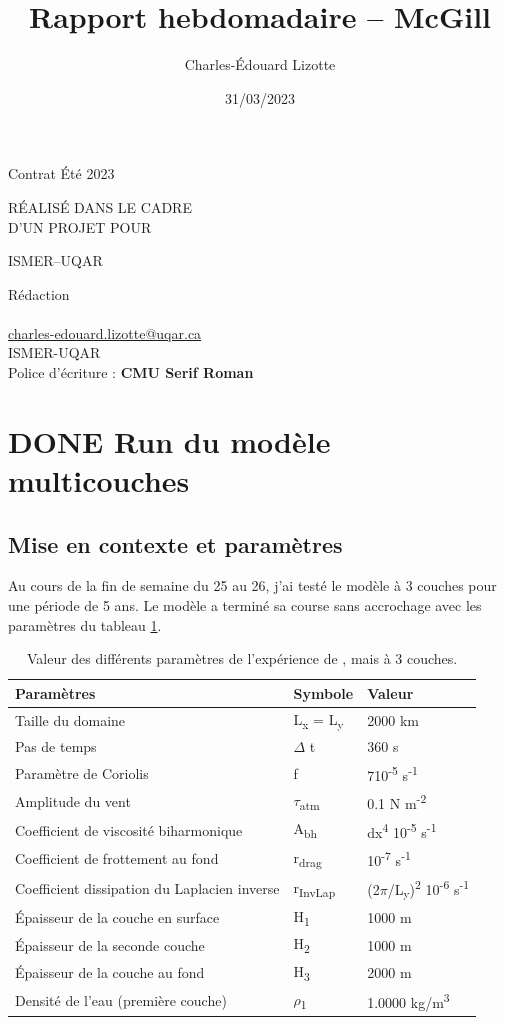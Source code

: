 \documentclass[10pt]{report}
\author{Charles-Édouard Lizotte}
\date{31/03/2023}
\title{Rapport hebdomadaire -- McGill}
\makeatletter
\numberwithin{equation}{section}
\newcommand{\mytitlepage}{
\begin{titlepage}
\begin{center}
{\Huge Contrat Été 2023 \par}
\vspace{2cm}
{\Huge \MakeUppercase{\thetitle} \par}
\vspace{2cm}
RÉALISÉ DANS LE CADRE\\ D'UN PROJET POUR \par
\vspace{2cm}
{\Huge ISMER--UQAR \par}
\vspace{2cm}
{\thedate}
\end{center}
\vfill
Rédaction \\
{\theauthor}\\
\url{charles-edouard.lizotte@uqar.ca}\\
ISMER-UQAR\\
Police d'écriture : \textbf{CMU Serif Roman}
\end{titlepage}
}
\makeatother
\begin{document}
\mytitlepage
\tableofcontents\newpage

\section{{\bfseries\sffamily DONE} Run du modèle multicouches}
\label{sec:orge168c7f}
\subsection{Mise en contexte et paramètres}
\label{sec:org00db628}
Au cours de la fin de semaine du 25 au 26, j'ai testé le modèle à 3 couches pour une période de 5 ans.
Le modèle a terminé sa course sans accrochage avec les paramètres du tableau \ref{tab:orgc535067}.

\begin{table}[htbp]
\caption{\label{tab:orgc535067}Valeur des différents paramètres de l'expérience de , mais à 3 couches.}
\centering
\begin{tabular}{lll}
\hline
\hline
Paramètres & Symbole & Valeur\\[0pt]
\hline
Taille du domaine & L\textsubscript{x} = L\textsubscript{y} & 2000 km\\[0pt]
Pas de temps & \(\Delta\) t & 360 s\\[0pt]
Paramètre de Coriolis & f & 7\texttimes{}10\textsuperscript{-5} s\textsuperscript{-1}\\[0pt]
Amplitude du vent & \(\tau\)\textsubscript{atm} & 0.1 N m\textsuperscript{-2}\\[0pt]
Coefficient de viscosité biharmonique & A\textsubscript{bh} & dx\textsuperscript{4} \texttimes{}10\textsuperscript{-5} s\textsuperscript{-1}\\[0pt]
Coefficient de frottement au fond & r\textsubscript{drag} & 10\textsuperscript{-7} s\textsuperscript{-1}\\[0pt]
Coefficient dissipation du Laplacien inverse & r\textsubscript{InvLap} & (2\(\pi\)/L\textsubscript{y})\textsuperscript{2} \texttimes{} 10\textsuperscript{-6} s\textsuperscript{-1}\\[0pt]
Épaisseur de la couche en surface & H\textsubscript{1} & 1000 m\\[0pt]
Épaisseur de la seconde couche & H\textsubscript{2} & 1000 m\\[0pt]
Épaisseur de la couche au fond & H\textsubscript{3} & 2000 m\\[0pt]
Densité de l'eau (première couche) & \(\rho\)\textsubscript{1} & 1.0000 kg/m\textsuperscript{3}\\[0pt]

\end{tabular}
\end{table}
\end{document}
